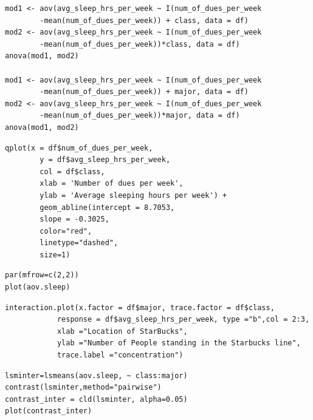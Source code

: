 \documentclass{article} %
\begin{document}
\lstset{language=R}
\lstset{frame=lines}
\lstset{basicstyle=\footnotesize}
\begin{lstlisting}
mod1 <- aov(avg_sleep_hrs_per_week ~ I(num_of_dues_per_week
		-mean(num_of_dues_per_week)) + class, data = df)
mod2 <- aov(avg_sleep_hrs_per_week ~ I(num_of_dues_per_week
		-mean(num_of_dues_per_week))*class, data = df)
anova(mod1, mod2)

mod1 <- aov(avg_sleep_hrs_per_week ~ I(num_of_dues_per_week
		-mean(num_of_dues_per_week)) + major, data = df)
mod2 <- aov(avg_sleep_hrs_per_week ~ I(num_of_dues_per_week
		-mean(num_of_dues_per_week))*major, data = df)
anova(mod1, mod2)
\end{lstlisting}

\lstset{language=R}
\lstset{frame=lines}
\lstset{basicstyle=\footnotesize}
\begin{lstlisting}
qplot(x = df$num_of_dues_per_week, 
		y = df$avg_sleep_hrs_per_week, 
		col = df$class,
		xlab = 'Number of dues per week',
		ylab = 'Average sleeping hours per week') + 
		geom_abline(intercept = 8.7053, 
		slope = -0.3025, 
		color="red", 
		linetype="dashed", 
		size=1)
\end{lstlisting}



\lstset{language=R}
\lstset{frame=lines}
\lstset{basicstyle=\footnotesize}
\begin{lstlisting}
par(mfrow=c(2,2))
plot(aov.sleep)
\end{lstlisting}


\lstset{language=R}
\lstset{frame=lines}
\lstset{basicstyle=\footnotesize}
\begin{lstlisting}
interaction.plot(x.factor = df$major, trace.factor = df$class,
			response = df$avg_sleep_hrs_per_week, type ="b",col = 2:3,
			xlab ="Location of StarBucks", 
			ylab ="Number of People standing in the Starbucks line",
			trace.label ="concentration")
\end{lstlisting}


\lstset{language=R}
\lstset{frame=lines}
\lstset{basicstyle=\footnotesize}
\begin{lstlisting}
lsminter=lsmeans(aov.sleep, ~ class:major)
contrast(lsminter,method="pairwise")
contrast_inter = cld(lsminter, alpha=0.05)
plot(contrast_inter)
\end{lstlisting}
\end{document}
